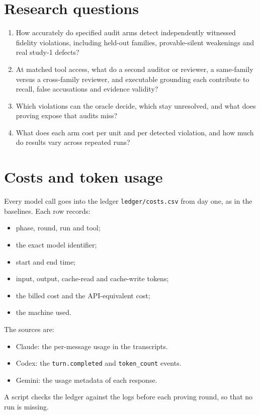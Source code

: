 \documentclass[11pt,a4paper]{article}
\newcommand{\code}[1]{\texttt{#1}}
\begin{document}
\section{Research questions}
\begin{enumerate}[label=RQ\arabic*.]
\item How accurately do specified audit arms detect independently witnessed fidelity violations, including held-out families, provable-silent weakenings and real study-1 defects?
\item At matched tool access, what do a second auditor or reviewer, a same-family versus a cross-family reviewer, and executable grounding each contribute to recall, false accusations and evidence validity?
\item Which violations can the oracle decide, which stay unresolved, and what does proving expose that audits miss?
\item What does each arm cost per unit and per detected violation, and how much do results vary across repeated runs?
\end{enumerate}

\section{Costs and token usage}
Every model call goes into the ledger \code{ledger/costs.csv} from day one, as in the baselines. Each row records:
\begin{itemize}
\item phase, round, run and tool;
\item the exact model identifier;
\item start and end time;
\item input, output, cache-read and cache-write tokens;
\item the billed cost and the API-equivalent cost;
\item the machine used.
\end{itemize}
The sources are:
\begin{itemize}
\item Claude: the per-message usage in the transcripts.
\item Codex: the \code{turn.completed} and \code{token\_count} events.
\item Gemini: the usage metadata of each response.
\end{itemize}
A script checks the ledger against the logs before each proving round, so that no run is missing.
\end{document}
